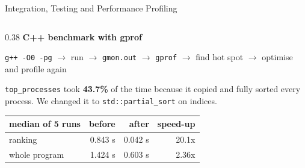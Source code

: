 \documentclass[aspectratio=169,10pt]{beamer}
\begin{document}
\begin{frame}{Integration, Testing and Performance Profiling}
\begin{columns}[T]
\begin{column}{0.38\textwidth}
\textbf{C++ benchmark with gprof}
\scriptsize

\vspace{0.1cm}
\texttt{g++ -O0 -pg} $\rightarrow$ run $\rightarrow$ \texttt{gmon.out} $\rightarrow$ \texttt{gprof}
$\rightarrow$ find hot spot $\rightarrow$ optimise and profile again

\vspace{0.2cm}
\texttt{top\_processes} took \textbf{43.7\%} of the time because it copied and fully sorted
every process. We changed it to \texttt{std::partial\_sort} on indices.

\vspace{0.2cm}
\begin{tabular}{lrrr}
\toprule
median of 5 runs & before & after & speed-up \\
\midrule
ranking & 0.843 s & 0.042 s & 20.1x \\
whole program & 1.424 s & 0.603 s & 2.36x \\
\bottomrule
\end{tabular}

\vspace{0.2cm}
\end{column}

\end{columns}
\end{frame}
\end{document}
